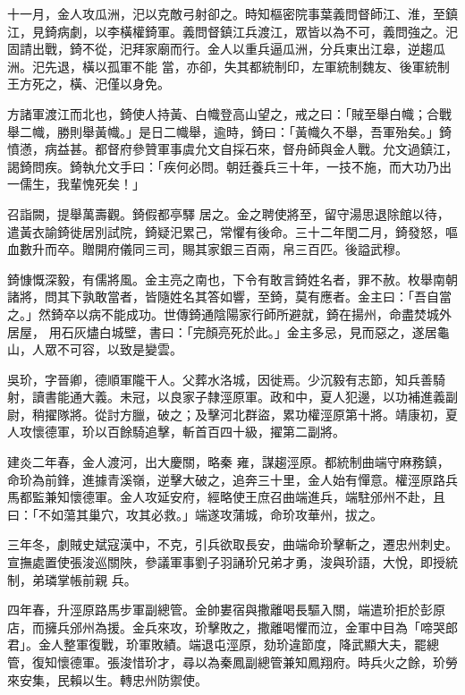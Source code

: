 \begin{pinyinscope}
 十一月，金人攻瓜洲，汜以克敵弓射卻之。時知樞密院事葉義問督師江、淮，至鎮江，見錡病劇，以李橫權錡軍。義問督鎮江兵渡江，眾皆以為不可，義問強之。汜固請出戰，錡不從，汜拜家廟而行。金人以重兵逼瓜洲，分兵東出江皋，逆趨瓜洲。汜先退，橫以孤軍不能
 當，亦卻，失其都統制印，左軍統制魏友、後軍統制王方死之，橫、汜僅以身免。



 方諸軍渡江而北也，錡使人持黃、白幟登高山望之，戒之曰：「賊至舉白幟；合戰舉二幟，勝則舉黃幟。」是日二幟舉，逾時，錡曰：「黃幟久不舉，吾軍殆矣。」錡憤懣，病益甚。都督府參贊軍事虞允文自採石來，督舟師與金人戰。允文過鎮江，謁錡問疾。錡執允文手曰：「疾何必問。朝廷養兵三十年，一技不施，而大功乃出一儒生，我輩愧死矣！」



 召詣闕，提舉萬壽觀。錡假都亭驛
 居之。金之聘使將至，留守湯思退除館以待，遣黃衣諭錡徙居別試院，錡疑汜累己，常懼有後命。三十二年閏二月，錡發怒，嘔血數升而卒。贈開府儀同三司，賜其家銀三百兩，帛三百匹。後謚武穆。



 錡慷慨深毅，有儒將風。金主亮之南也，下令有敢言錡姓名者，罪不赦。枚舉南朝諸將，問其下孰敢當者，皆隨姓名其答如響，至錡，莫有應者。金主曰：「吾自當之。」然錡卒以病不能成功。世傳錡通陰陽家行師所避就，錡在揚州，命盡焚城外居屋，
 用石灰燼白城壁，書曰：「完顏亮死於此。」金主多忌，見而惡之，遂居龜山，人眾不可容，以致是變雲。



 吳玠，字晉卿，德順軍隴干人。父葬水洛城，因徙焉。少沉毅有志節，知兵善騎射，讀書能通大義。未冠，以良家子隸涇原軍。政和中，夏人犯邊，以功補進義副尉，稍擢隊將。從討方臘，破之；及擊河北群盜，累功權涇原第十將。靖康初，夏人攻懷德軍，玠以百餘騎追擊，斬首百四十級，擢第二副將。



 建炎二年春，金人渡河，出大慶關，略秦
 雍，謀趨涇原。都統制曲端守麻務鎮，命玠為前鋒，進據青溪嶺，逆擊大破之，追奔三十里，金人始有憚意。權涇原路兵馬都監兼知懷德軍。金人攻延安府，經略使王庶召曲端進兵，端駐邠州不赴，且曰：「不如蕩其巢穴，攻其必救。」端遂攻蒲城，命玠攻華州，拔之。



 三年冬，劇賊史斌寇漢中，不克，引兵欲取長安，曲端命玠擊斬之，遷忠州刺史。宣撫處置使張浚巡關陜，參議軍事劉子羽誦玠兄弟才勇，浚與玠語，大悅，即授統制，弟璘掌帳前親
 兵。



 四年春，升涇原路馬步軍副總管。金帥婁宿與撒離喝長驅入關，端遣玠拒於彭原店，而擁兵邠州為援。金兵來攻，玠擊敗之，撒離喝懼而泣，金軍中目為「啼哭郎君」。金人整軍復戰，玠軍敗績。端退屯涇原，劾玠違節度，降武顯大夫，罷總管，復知懷德軍。張浚惜玠才，尋以為秦鳳副總管兼知鳳翔府。時兵火之餘，玠勞來安集，民賴以生。轉忠州防禦使。




\end{pinyinscope}

